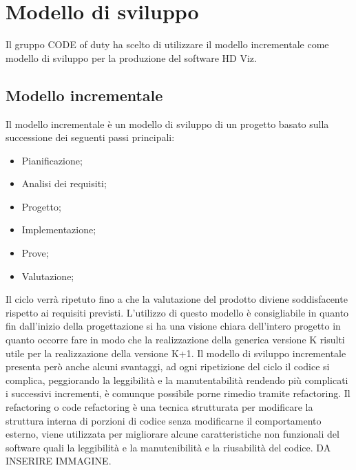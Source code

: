 \section{Modello di sviluppo}
Il gruppo CODE of duty ha scelto di utilizzare il modello incrementale come modello di sviluppo per la produzione del software HD Viz.
\subsection{Modello incrementale}
Il modello incrementale è un modello di sviluppo di un progetto basato sulla successione dei seguenti passi principali:
\begin{itemize}
	\item Pianificazione;
	\item Analisi dei requisiti;
	\item Progetto;
	\item Implementazione;
	\item Prove;
	\item Valutazione;
\end{itemize}
Il ciclo verrà ripetuto fino a che la valutazione del prodotto diviene soddisfacente rispetto ai requisiti previsti.
L'utilizzo di questo modello è consigliabile in quanto fin dall'inizio della progettazione si ha una visione chiara 
dell'intero progetto in quanto occorre fare in modo che la realizzazione della generica versione K risulti utile per 
la realizzazione della versione K+1.
Il modello di sviluppo incrementale presenta però anche alcuni svantaggi, ad ogni ripetizione del ciclo il codice si complica, 
peggiorando la leggibilità e la manutentabilità rendendo più complicati i successivi incrementi, è comunque possibile porne rimedio tramite refactoring.
Il refactoring o code refactoring è una tecnica strutturata per modificare la struttura interna di porzioni di codice senza modificarne
il comportamento esterno, viene utilizzata per migliorare alcune caratteristiche non funzionali del software quali la leggibilità e la manutenibilità e la riusabilità del codice.
DA INSERIRE IMMAGINE.